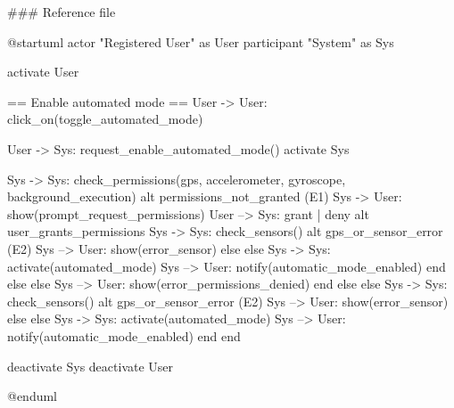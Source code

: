 ### Reference file

@startuml
actor "Registered User" as User
participant "System" as Sys

activate User


== Enable automated mode ==
User -> User: click_on(toggle_automated_mode)

User -> Sys: request_enable_automated_mode()
activate Sys

Sys -> Sys: check_permissions(gps, accelerometer, gyroscope, background_execution)
alt permissions_not_granted (E1)
    Sys -> User: show(prompt_request_permissions)
    User --> Sys: grant | deny
    alt user_grants_permissions    
        Sys -> Sys: check_sensors()
        alt gps_or_sensor_error (E2)
            Sys --> User: show(error_sensor)
        else else
            Sys -> Sys: activate(automated_mode)
            Sys --> User: notify(automatic_mode_enabled)
        end
    else else
        Sys --> User: show(error_permissions_denied)
    end
else else
    Sys -> Sys: check_sensors()
    alt gps_or_sensor_error (E2)
        Sys --> User: show(error_sensor)
    else else
        Sys -> Sys: activate(automated_mode)
        Sys --> User: notify(automatic_mode_enabled)
    end
end

deactivate Sys
deactivate User

@enduml
